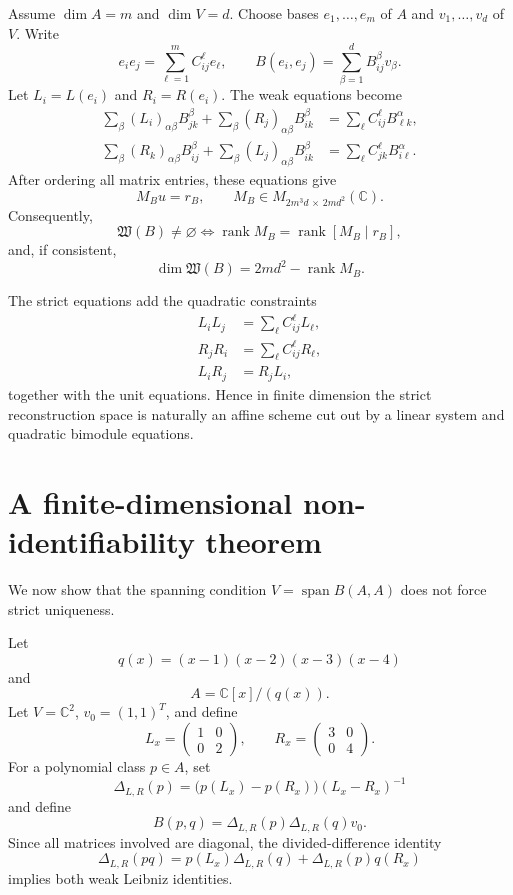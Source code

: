\documentclass[11pt]{amsart}
\newcommand{\Span}{\operatorname{span}}
\newcommand{\rank}{\operatorname{rank}}
\newcommand{\Wfib}{\mathfrak W}
\newcommand{\C}{\mathbb C}
\begin{document}
Assume $\dim A=m$ and $\dim V=d$.  Choose bases $e_1,\dots,e_m$ of $A$ and $v_1,\dots,v_d$ of $V$.  Write
\[
e_i e_j=\sum_{\ell=1}^m C_{ij}^{\ell}e_\ell,
\qquad
B(e_i,e_j)=\sum_{\beta=1}^d B_{ij}^{\beta}v_\beta.
\]
Let $L_i=L(e_i)$ and $R_i=R(e_i)$.  The weak equations become
\begin{align}
\sum_{\beta}(L_i)_{\alpha\beta}B_{jk}^{\beta}
+\sum_{\beta}(R_j)_{\alpha\beta}B_{ik}^{\beta}
&=\sum_{\ell}C_{ij}^{\ell}B_{\ell k}^{\alpha}, \label{eq:matrix-left}\\
\sum_{\beta}(R_k)_{\alpha\beta}B_{ij}^{\beta}
+\sum_{\beta}(L_j)_{\alpha\beta}B_{ik}^{\beta}
&=\sum_{\ell}C_{jk}^{\ell}B_{i\ell}^{\alpha}. \label{eq:matrix-right}
\end{align}
After ordering all matrix entries, these equations give
\[
M_Bu=r_B,
\qquad
M_B\in M_{2m^3d\,\times\,2md^2}(\C).
\]
Consequently,
\[
\Wfib(B)\neq\varnothing
\iff
\rank M_B=\rank[M_B\mid r_B],
\]
and, if consistent,
\[
\dim\Wfib(B)=2md^2-\rank M_B.
\]

The strict equations add the quadratic constraints
\begin{align*}
L_iL_j&=\sum_{\ell}C_{ij}^{\ell}L_\ell,\\
R_jR_i&=\sum_{\ell}C_{ij}^{\ell}R_\ell,\\
L_iR_j&=R_jL_i,
\end{align*}
together with the unit equations.  Hence in finite dimension the strict reconstruction space is naturally an affine scheme cut out by a linear system and quadratic bimodule equations.

\section{A finite-dimensional non-identifiability theorem}\label{sec:finite-example}

We now show that the spanning condition $V=\Span B(A,A)$ does not force strict uniqueness.

Let
\[
q(x)=(x-1)(x-2)(x-3)(x-4)
\]
and
\[
A=\C[x]/(q(x)).
\]
Let $V=\C^2$, $v_0=(1,1)^T$, and define
\[
L_x=\begin{pmatrix}1&0\\0&2\end{pmatrix},
\qquad
R_x=\begin{pmatrix}3&0\\0&4\end{pmatrix}.
\]
For a polynomial class $p\in A$, set
\[
\Delta_{L,R}(p)=\bigl(p(L_x)-p(R_x)\bigr)(L_x-R_x)^{-1}
\]
and define
\[
B(p,q)=\Delta_{L,R}(p)\Delta_{L,R}(q)v_0.
\]
Since all matrices involved are diagonal, the divided-difference identity
\[
\Delta_{L,R}(pq)=p(L_x)\Delta_{L,R}(q)+\Delta_{L,R}(p)q(R_x)
\]
implies both weak Leibniz identities.
\end{document}
